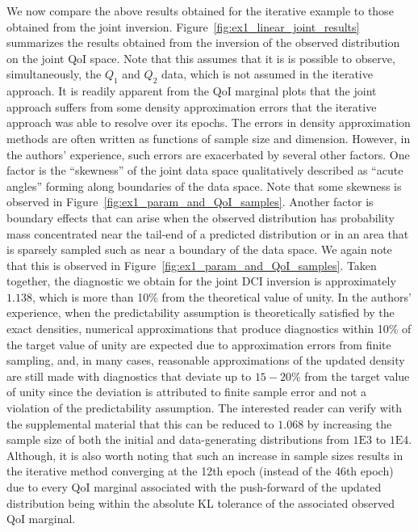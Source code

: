 \documentclass{article}
\newcounter{example}[section]
\newcommand{\expnumber}[2]{{#1}\mathrm{E}{#2}}
\begin{document}
We now compare the above results obtained for the iterative example to those obtained from the joint inversion.
Figure~\ref{fig:ex1_linear_joint_results} summarizes the results obtained from the inversion of the observed distribution on the joint QoI space.
Note that this assumes that it is is possible to observe, simultaneously, the $Q_1$ and $Q_2$ data, which is not assumed in the iterative approach.
It is readily apparent from the QoI marginal plots that the joint approach suffers from some density approximation errors that the iterative approach was able to resolve over its epochs.
The errors in density approximation methods are often written as functions of sample size and dimension. 
However, in the authors' experience, such errors are exacerbated by several other factors.
One factor is the ``skewness'' of the joint data space qualitatively described as ``acute angles'' forming along boundaries of the data space.
Note that some skewness is observed in Figure~\ref{fig:ex1_param_and_QoI_samples}.
Another factor is boundary effects that can arise when the observed distribution has probability mass concentrated near the tail-end of a predicted distribution or in an area that is sparsely sampled such as near a boundary of the data space.
We again note that this is observed in Figure~\ref{fig:ex1_param_and_QoI_samples}.
Taken together, the diagnostic we obtain for the joint DCI inversion is approximately $1.138$, which is more than 10\% from the theoretical value of unity.
In the authors' experience, when the predictability assumption is theoretically satisfied by the exact densities, numerical approximations that produce diagnostics within 10\% of the target value of unity are expected due to approximation errors from finite sampling, and, in many cases, reasonable approximations of the updated density are still made with diagnostics that deviate up to $15-20\%$ from the target value of unity since the deviation is attributed to finite sample error and not a violation of the predictability assumption.
The interested reader can verify with the supplemental material that this can be reduced to $1.068$ by increasing the sample size of both the initial and data-generating distributions from $\expnumber{1}{3}$ to $\expnumber{1}{4}$.
Although, it is also worth noting that such an increase in sample sizes results in the iterative method converging at the 12th epoch (instead of the 46th epoch) due to every QoI marginal associated with the push-forward of the updated distribution being within the absolute KL tolerance of the associated observed QoI marginal.
\end{document}
